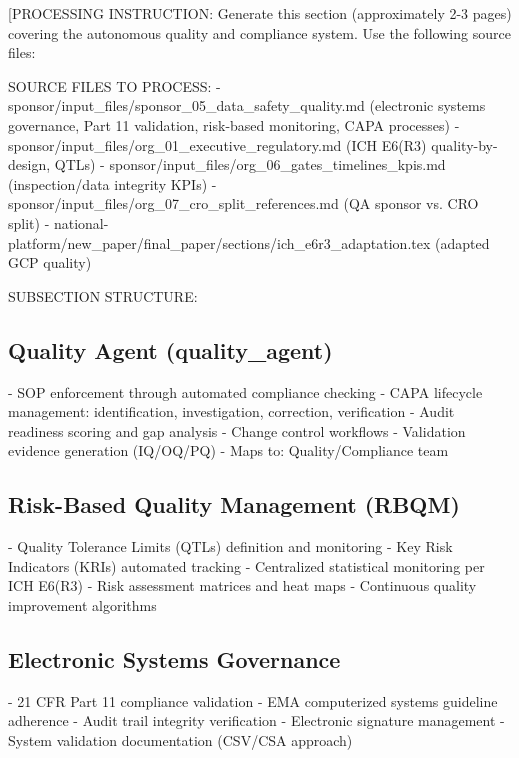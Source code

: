 
[PROCESSING INSTRUCTION: Generate this section (approximately 2-3 pages) covering the
autonomous quality and compliance system. Use the following source files:

SOURCE FILES TO PROCESS:
- sponsor/input\_files/sponsor\_05\_data\_safety\_quality.md (electronic systems governance,
  Part 11 validation, risk-based monitoring, CAPA processes)
- sponsor/input\_files/org\_01\_executive\_regulatory.md (ICH E6(R3) quality-by-design, QTLs)
- sponsor/input\_files/org\_06\_gates\_timelines\_kpis.md (inspection/data integrity KPIs)
- sponsor/input\_files/org\_07\_cro\_split\_references.md (QA sponsor vs. CRO split)
- national-platform/new\_paper/final\_paper/sections/ich\_e6r3\_adaptation.tex (adapted GCP quality)

SUBSECTION STRUCTURE:

\subsection{Quality Agent (quality\_agent)}
- SOP enforcement through automated compliance checking
- CAPA lifecycle management: identification, investigation, correction, verification
- Audit readiness scoring and gap analysis
- Change control workflows
- Validation evidence generation (IQ/OQ/PQ)
- Maps to: Quality/Compliance team

\subsection{Risk-Based Quality Management (RBQM)}
- Quality Tolerance Limits (QTLs) definition and monitoring
- Key Risk Indicators (KRIs) automated tracking
- Centralized statistical monitoring per ICH E6(R3)
- Risk assessment matrices and heat maps
- Continuous quality improvement algorithms

\subsection{Electronic Systems Governance}
- 21 CFR Part 11 compliance validation
- EMA computerized systems guideline adherence
- Audit trail integrity verification
- Electronic signature management
- System validation documentation (CSV/CSA approach)

